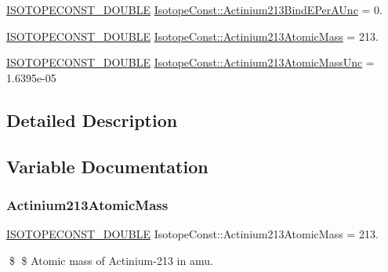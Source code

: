 \begin{DoxyCompactItemize}
\mbox{\hyperlink{group___isotope_const-_macros_ga8f45a7272ce02c0b4c65c44636ed719a}{I\+S\+O\+T\+O\+P\+E\+C\+O\+N\+S\+T\+\_\+\+D\+O\+U\+B\+LE}} \mbox{\hyperlink{group___isotope_const-_actinium-_ac213_gac8ec63fe75db6d3db57b79e41b733e8a}{Isotope\+Const\+::\+Actinium213\+Bind\+E\+Per\+A\+Unc}} = 0.
\item 
\mbox{\hyperlink{group___isotope_const-_macros_ga8f45a7272ce02c0b4c65c44636ed719a}{I\+S\+O\+T\+O\+P\+E\+C\+O\+N\+S\+T\+\_\+\+D\+O\+U\+B\+LE}} \mbox{\hyperlink{group___isotope_const-_actinium-_ac213_gafafce27ecaf97c314824867fa66c7462}{Isotope\+Const\+::\+Actinium213\+Atomic\+Mass}} = 213.
\item 
\mbox{\hyperlink{group___isotope_const-_macros_ga8f45a7272ce02c0b4c65c44636ed719a}{I\+S\+O\+T\+O\+P\+E\+C\+O\+N\+S\+T\+\_\+\+D\+O\+U\+B\+LE}} \mbox{\hyperlink{group___isotope_const-_actinium-_ac213_ga69223632305adc2d8d0a4ccf0660a189}{Isotope\+Const\+::\+Actinium213\+Atomic\+Mass\+Unc}} = 1.\+6395e-\/05
\end{DoxyCompactItemize}


\subsection{Detailed Description}


\subsection{Variable Documentation}
\mbox{\label{group___isotope_const-_actinium-_ac213_gafafce27ecaf97c314824867fa66c7462}} 
\subsubsection{\texorpdfstring{Actinium213\+Atomic\+Mass}{Actinium213AtomicMass}}
{\footnotesize\ttfamily \mbox{\hyperlink{group___isotope_const-_macros_ga8f45a7272ce02c0b4c65c44636ed719a}{I\+S\+O\+T\+O\+P\+E\+C\+O\+N\+S\+T\+\_\+\+D\+O\+U\+B\+LE}} Isotope\+Const\+::\+Actinium213\+Atomic\+Mass = 213.}

\$ \$ Atomic mass of Actinium-\/213 in amu. \mbox{\label{group___isotope_const-_actinium-_ac213_ga69223632305adc2d8d0a4ccf0660a189}} 
